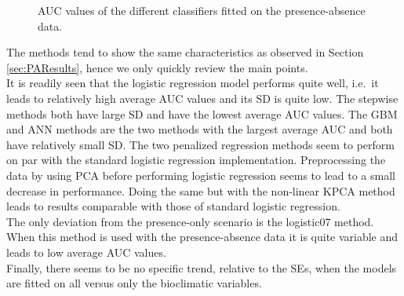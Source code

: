 \begin{figure}[!htb]
\center
{}
\caption{\label{fig:PrAbAUC}AUC values of the different classifiers fitted on the presence-absence data.}
\end{figure}

The methods tend to show the same characteristics as observed in Section \ref{sec:PAResults}, hence we only quickly review the main points. \\


It is readily seen that the logistic regression model performs quite well, i.e.\ it leads to relatively high average AUC values and its SD is quite low. The stepwise methods both have large SD and have the lowest average AUC values. The GBM and ANN methods are the two methods with the largest average AUC and both have relatively small SD. The two penalized regression methods seem to perform on par with the standard logistic regression implementation. Preprocessing the data by using PCA before performing logistic regression seems to lead to a small decrease in performance. Doing the same but with the non-linear KPCA method leads to results comparable with those of standard logistic regression. \\

The only deviation from the presence-only scenario is the logistic07 method. When this method is used with the presence-absence data it is quite variable and leads to low average AUC values. \\

Finally, there seems to be no specific trend, relative to the SEs, when the models are fitted on all versus only the bioclimatic variables. 

